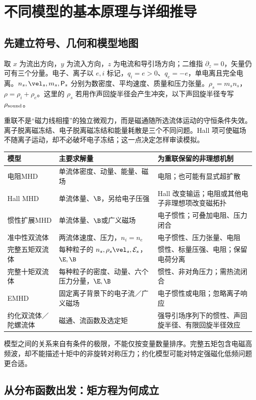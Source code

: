\chapter{不同模型的基本原理与详细推导}\label{ch:models}
\section{先建立符号、几何和模型地图}
取 $x$ 为流出方向，$y$ 为流入方向，$z$ 为电流和导引场方向；二维指 $\partial_z=0$，矢量仍可有三个分量。电子、离子以 $e,i$ 标记，$q_i=e>0$、$q_e=-e$，单电离且完全电离。$n_s,\vel_s,m_s,\mathsf P_s$ 分别为数密度、平均速度、质量和压力张量。$\rho_s=m_sn_s$，$\rho=\rho_i+\rho_e$。这里的 $\rho_s$ 若用作声回旋半径会产生冲突，以下声回旋半径专写 $\rho_{\rm sound}$。

重联不是“磁力线相撞”的独立微观力，而是磁通随所选流体运动的守恒条件失效。离子脱离磁冻结、电子脱离磁冻结和能量耗散是三个不同问题。Hall 项可使磁场不随离子运动，却不必破坏电子冻结；这一点决定怎样审读模拟。

\begin{longtable}{P{30mm}P{55mm}P{63mm}}
\toprule 模型 & 主要求解量 & 为重联保留的非理想机制\\\midrule
电阻MHD & 单流体密度、动量、能量、磁场 & 电阻；也可能有显式超扩散\\
Hall MHD & 单流体量、$\B$，另给电子压强 & Hall 改变输运；电阻或其他电子非理想项改变磁拓扑\\
惯性扩展MHD & 单流体量、$\B$或广义磁场 & 电子惯性；可叠加电阻、压力闭合\\
准中性双流体 & 两流体速度、压力，$n_i=n_e$ & 电子惯性、压力张量、电阻\\
完整五矩双流体 & 每种粒子的 $n_s,\rho_s\vel_s,\mathcal E_s$，$\E,\B$ & 惯性、标量压强、电阻；保留电荷分离\\
完整十矩双流体 & 每种粒子的密度、动量、六个压力分量，$\E,\B$ & 惯性、非对角压力；需热流闭合\\
EMHD & 固定离子背景下的电子流／广义磁场 & 电子惯性或电阻；忽略离子响应\\
约化双流体／陀螺流体 & 磁通、流函数及选定矩 & 强导引场序列下的惯性、声回旋半径、有限回旋半径效应\\\bottomrule
\end{longtable}
模型之间的关系来自有条件的极限，不能仅按变量数量排序。完整五矩包含电磁高频波，却不能描述十矩中的非旋转对称压力；约化模型可能对特定强磁化低频问题更合适。\citep{Wang2015,Hakim2008}

\section{从分布函数出发：矩方程为何成立}

